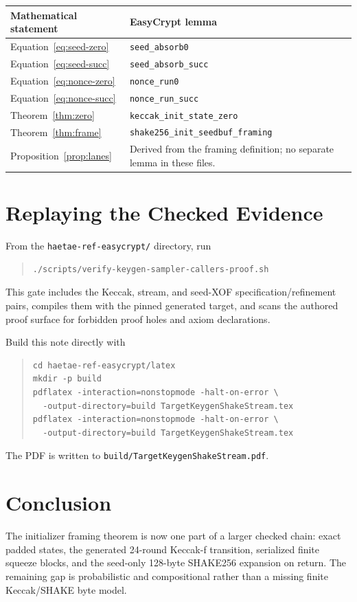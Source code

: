 \documentclass[11pt]{article}
\theoremstyle{definition}
\theoremstyle{plain}
\theoremstyle{remark}
\newcommand{\code}[1]{\nolinkurl{#1}}
\begin{document}
\begin{center}
\small
\begin{tabularx}{0.96\textwidth}{>{\raggedright\arraybackslash}p{}X}
\toprule
Mathematical statement & EasyCrypt lemma \\
\midrule
Equation~\eqref{eq:seed-zero} & \code{seed_absorb0} \\
Equation~\eqref{eq:seed-succ} & \code{seed_absorb_succ} \\
Equation~\eqref{eq:nonce-zero} & \code{nonce_run0} \\
Equation~\eqref{eq:nonce-succ} & \code{nonce_run_succ} \\
Theorem~\ref{thm:zero} & \code{keccak_init_state_zero} \\
Theorem~\ref{thm:frame} & \code{shake256_init_seedbuf_framing} \\
Proposition~\ref{prop:lanes} & Derived from the framing definition; no
separate lemma in these files. \\
\bottomrule
\end{tabularx}
\end{center}

\section{Replaying the Checked Evidence}

From the \code{haetae-ref-easycrypt/} directory, run
\begin{quote}
\begin{verbatim}
./scripts/verify-keygen-sampler-callers-proof.sh
\end{verbatim}
\end{quote}
This gate includes the Keccak, stream, and seed-XOF specification/refinement
pairs, compiles them with the pinned generated target, and scans the authored
proof surface for forbidden proof holes and axiom declarations.

Build this note directly with
\begin{quote}
\begin{verbatim}
cd haetae-ref-easycrypt/latex
mkdir -p build
pdflatex -interaction=nonstopmode -halt-on-error \
  -output-directory=build TargetKeygenShakeStream.tex
pdflatex -interaction=nonstopmode -halt-on-error \
  -output-directory=build TargetKeygenShakeStream.tex
\end{verbatim}
\end{quote}
The PDF is written to \code{build/TargetKeygenShakeStream.pdf}.

\section*{Conclusion}

The initializer framing theorem is now one part of a larger checked chain:
exact padded states, the generated 24-round Keccak-f transition, serialized
finite squeeze blocks, and the seed-only 128-byte SHAKE256 expansion on return.
The remaining gap is probabilistic and compositional rather than a missing
finite Keccak/SHAKE byte model.
\end{document}
